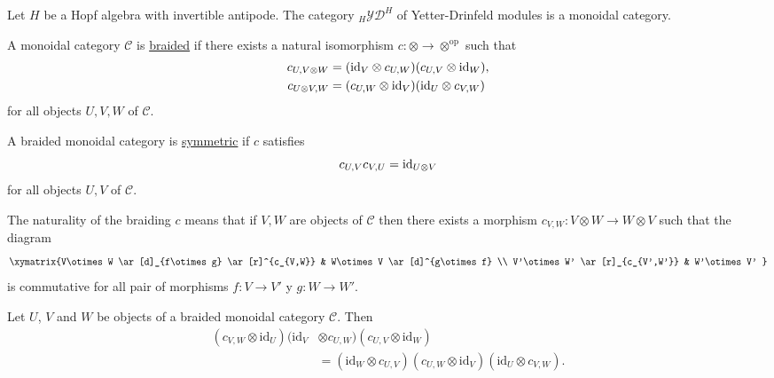 \begin{example}
Let $H$ be a Hopf algebra with invertible antipode. The category
$_H\mathcal{YD}^H$ of Yetter-Drinfeld modules is a monoidal category. 
\end{example}


\begin{definition}
A monoidal category $\mathcal{C}$ is \underline{braided} if there
exists a natural isomorphism $c:\otimes\to\otimes^{\mathrm{op}}$
such that
\begin{align}
c_{U,V\otimes W} & =(\id_{V}\otimes c_{U,W})(c_{U,V}\otimes\id_{W}),\label{eq:braided1}\\
c_{U\otimes V,W} & =(c_{U,W}\otimes\id_{V})(\id_{U}\otimes c_{V,W})\label{eq:braided2}
\end{align}
for all objects $U,V,W$ of $\mathcal{C}$. 
\end{definition}

\begin{definition}
A braided monoidal category is \underline{symmetric} if $c$ satisfies
\[
c_{U,V}c_{V,U}=\mathrm{id}_{U\otimes V}
\]
for all objects $U,V$ of $\mathcal{C}$.
\end{definition}

\begin{remark}
The naturality of the braiding $c$ means that if $V,W$ are objects
of $\mathcal{C}$ then there exists a morphism $c_{V,W}:V\otimes W\to W\otimes V$
such that the diagram 
\[
\xymatrix{V\otimes W \ar[d]_{f\otimes g} \ar[r]^{c_{V,W}} & W\otimes V \ar[d]^{g\otimes f} \\ V'\otimes W' \ar[r]_{c_{V',W'}} & W'\otimes V' }
\]
is commutative for all pair of morphisms $f:V\to V'$ y $g:W\to W'$.
\end{remark}

\begin{proposition}
Let $U$, $V$ and $W$ be objects of a braided monoidal category $\mathcal{C}$.
Then 
\begin{align*}
(c_{V,W}\otimes\textrm{id}_{U})(\textrm{id}_{V}&\otimes c_{U,W})(c_{U,V}\otimes\textrm{id}_{W})\\
&=(\textrm{id}_{W}\otimes c_{U,V})(c_{U,W}\otimes\textrm{id}_{V})(\textrm{id}_{U}\otimes c_{V,W}).
\end{align*}
\end{proposition}

